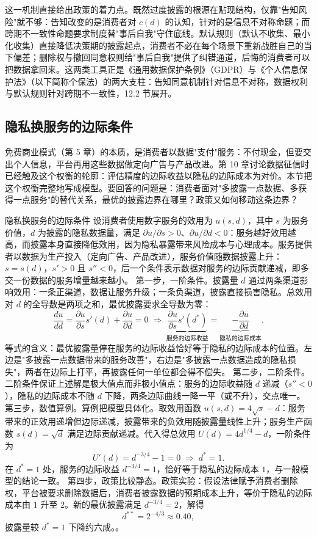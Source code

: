 这一机制直接给出政策的着力点。既然过度披露的根源在贴现结构，仅靠"告知风险"就不够：告知改变的是消费者对 $c(d)$ 的认知，针对的是信息不对称命题；而跨期不一致性命题要求制度替"事后自我"守住底线。默认规则（默认不收集、最小化收集）直接降低决策期的披露起点，消费者不必在每个场景下重新战胜自己的当下偏差；删除权与撤回同意权则给"事后自我"提供了纠错通道，后悔的消费者可以把数据拿回来。这两类工具正是《通用数据保护条例》（GDPR）与《个人信息保护法》（以下简称个保法）的两大支柱：告知同意机制针对信息不对称，数据权利与默认规则针对跨期不一致性，12.2 节展开。

\subsection{隐私换服务的边际条件}

免费商业模式（第 5 章）的本质，是消费者以数据"支付"服务：不付现金，但要交出个人信息，平台再用这些数据做定向广告与产品改进。第 10 章讨论数据征信时已经触及这个权衡的轮廓：评估精度的边际收益以隐私的边际成本为对价。本节把这个权衡完整地写成模型。要回答的问题是：消费者面对"多披露一点数据、多获得一点服务"的替代关系，最优的披露边界在哪里？政策又如何移动这条边界？

\begin{derivation}{隐私换服务的边际条件}{}
设消费者使用数字服务的效用为 $u(s,d)$，其中 $s$ 为服务价值，$d$ 为披露的隐私数据量，满足 $\partial u/\partial s > 0$、$\partial u/\partial d < 0$：服务越好效用越高，而披露本身直接降低效用，因为隐私暴露带来风险成本与心理成本。服务提供者以数据为生产投入（定向广告、产品改进），服务价值随数据披露上升：$s = s(d)$，$s'>0$ 且 $s''<0$，后一个条件表示数据对服务的边际贡献递减，即多交一份数据的服务增量越来越小。
第一步，一阶条件。披露量 $d$ 通过两条渠道影响效用：一条正渠道，数据让服务升级；一条负渠道，披露直接损害隐私。总效用对 $d$ 的全导数是两项之和，最优披露要求全导数为零：
\[
\frac{du}{dd} = \frac{\partial u}{\partial s} s'(d) + \frac{\partial u}{\partial d} = 0
\;\Rightarrow\;
\underbrace{\frac{\partial u}{\partial s} s'(d^*)}_{\text{服务的边际收益}} = \underbrace{-\frac{\partial u}{\partial d}}_{\text{隐私的边际成本}}.
\]
等式的含义：最优披露量停在服务的边际收益恰好等于隐私的边际成本的位置。左边是"多披露一点数据带来的服务改善"，右边是"多披露一点数据造成的隐私损失"，两者在边际上打平，再披露任何一单位都会得不偿失。
第二步，二阶条件。二阶条件保证上述解是极大值点而非极小值点：服务的边际收益随 $d$ 递减（$s''<0$），隐私的边际成本不随 $d$ 下降，两条边际曲线一降一平（或不升），交点唯一。
第三步，数值算例。算例把模型具体化。取效用函数 $u(s,d) = 4\sqrt{s} - d$：服务带来的正效用递增但边际递减，披露带来的负效用随披露量线性上升；服务生产函数 $s(d) = \sqrt{d}$ 满足边际贡献递减。代入得总效用 $U(d) = 4d^{1/4} - d$，一阶条件为
\[
U'(d) = d^{-3/4} - 1 = 0 \;\Rightarrow\; d^* = 1.
\]
在 $d^* = 1$ 处，服务的边际收益 $d^{-3/4} = 1$，恰好等于隐私的边际成本 $1$，与一般模型的结论一致。
第四步，政策比较静态。政策实验：假设法律赋予消费者删除权，平台被要求删除数据后，消费者披露数据的预期成本上升，等价于隐私的边际成本由 $1$ 升至 $2$。新的最优披露满足 $d^{-3/4} = 2$，解得
\[
d^{**} = 2^{-4/3} \approx 0.40,
\]
披露量较 $d^* = 1$ 下降约六成。。
\end{derivation}

